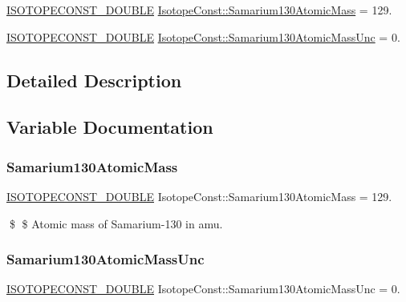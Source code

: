 \begin{DoxyCompactItemize}
\item 
\mbox{\hyperlink{group___isotope_const-_macros_ga8f45a7272ce02c0b4c65c44636ed719a}{I\+S\+O\+T\+O\+P\+E\+C\+O\+N\+S\+T\+\_\+\+D\+O\+U\+B\+LE}} \mbox{\hyperlink{group___isotope_const-_samarium-_sm130_gaafe8e8836d6ff8117485071af919754f}{Isotope\+Const\+::\+Samarium130\+Atomic\+Mass}} = 129.
\item 
\mbox{\hyperlink{group___isotope_const-_macros_ga8f45a7272ce02c0b4c65c44636ed719a}{I\+S\+O\+T\+O\+P\+E\+C\+O\+N\+S\+T\+\_\+\+D\+O\+U\+B\+LE}} \mbox{\hyperlink{group___isotope_const-_samarium-_sm130_ga788e5b104bffd19ab54033601cfcadaf}{Isotope\+Const\+::\+Samarium130\+Atomic\+Mass\+Unc}} = 0.
\end{DoxyCompactItemize}


\subsection{Detailed Description}


\subsection{Variable Documentation}
\mbox{\label{group___isotope_const-_samarium-_sm130_gaafe8e8836d6ff8117485071af919754f}} 
\subsubsection{\texorpdfstring{Samarium130\+Atomic\+Mass}{Samarium130AtomicMass}}
{\footnotesize\ttfamily \mbox{\hyperlink{group___isotope_const-_macros_ga8f45a7272ce02c0b4c65c44636ed719a}{I\+S\+O\+T\+O\+P\+E\+C\+O\+N\+S\+T\+\_\+\+D\+O\+U\+B\+LE}} Isotope\+Const\+::\+Samarium130\+Atomic\+Mass = 129.}

\$ \$ Atomic mass of Samarium-\/130 in amu. \mbox{\label{group___isotope_const-_samarium-_sm130_ga788e5b104bffd19ab54033601cfcadaf}} 
\subsubsection{\texorpdfstring{Samarium130\+Atomic\+Mass\+Unc}{Samarium130AtomicMassUnc}}
{\footnotesize\ttfamily \mbox{\hyperlink{group___isotope_const-_macros_ga8f45a7272ce02c0b4c65c44636ed719a}{I\+S\+O\+T\+O\+P\+E\+C\+O\+N\+S\+T\+\_\+\+D\+O\+U\+B\+LE}} Isotope\+Const\+::\+Samarium130\+Atomic\+Mass\+Unc = 0.}


